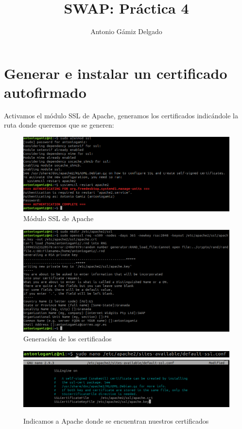 \documentclass[12pt]{article}
\title{SWAP: Práctica 4}
\author{
        Antonio Gámiz Delgado
}
\begin{document}
\maketitle

\section{Generar e instalar un certificado autofirmado }

Activamos el módulo SSL de Apache, generamos los certificados indicándole la ruta donde queremos que se generen:

\begin{figure}[H]
\center
\includegraphics[scale=0.5]{1.png}
\caption{Módulo SSL de Apache}
\end{figure}
\begin{figure}[H]
\center
\includegraphics[scale=0.5]{2.png}
\caption{Generación de los certificados}
\end{figure}

\begin{figure}[H]
\center
\includegraphics[scale=0.5]{3.png}
\includegraphics[scale=0.5]{4.png}
\caption{Indicamos a Apache donde se encuentran nuestros certificados}
\end{figure}
\end{document}
